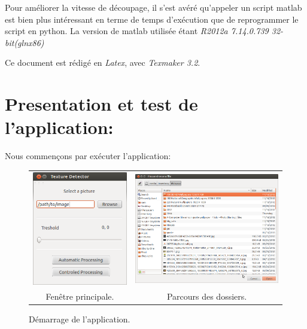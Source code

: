 Pour améliorer la vitesse de découpage, il s'est avéré qu'appeler un script matlab est bien plus intéressant en terme de temps d’exécution que de reprogrammer le script en python.
La version de matlab utilisée étant \textit{R2012a 7.14.0.739 32-bit(glnx86)} 

Ce document est rédigé en \textit{Latex}, avec \textit{Texmaker 3.2}.


\section{Presentation et test de l'application:}

Nous commençons par exécuter l'application:

\iffalse

\begin{figure}[H]
\centering
\begin{tabular}{cc}
\centering
\includegraphics[width=5cm,]{Figures/chap3/1.png}
&
\includegraphics[width=8cm,]{Figures/chap3/2.png}\\

Fenêtre principale.
 &
Parcours des dossiers.

\end{tabular}
\caption[application]{Démarrage de l'application.}
\end{figure}

